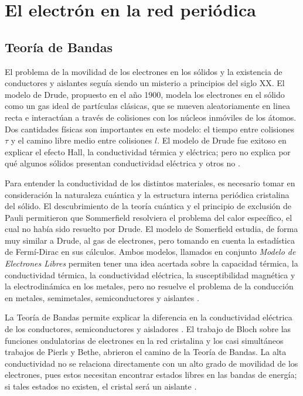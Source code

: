 \chapter{El electrón en la red periódica}

\section{Teoría de Bandas}\label{cap:1}
El problema de la movilidad de los electrones en los sólidos y la existencia de conductores y aislantes seguía siendo un misterio a principios del siglo XX. El modelo de Drude, propuesto en el año 1900, modela los electrones en el sólido como un gas ideal de partículas clásicas, que se mueven aleatoriamente en linea recta e interactúan a través de colisiones con los núcleos inmóviles de los átomos. Dos cantidades físicas son importantes en este modelo: el tiempo entre colisiones $\tau$ y el camino libre medio entre colisiones $l$. El modelo de Drude fue exitoso en explicar el efecto Hall, la conductividad térmica y eléctrica; pero no explica por qué algunos sólidos presentan conductividad eléctrica y otros no \cite{kittel}.

Para entender la conductividad de los distintos materiales, es necesario tomar en consideración la naturaleza cuántica y la estructura interna periódica cristalina del sólido. El descubrimiento de la teoría cuántica y el principio de exclusión de Pauli permitieron que Sommerfield resolviera el problema del calor específico, el cual no había sido resuelto por Drude. El modelo de Somerfield estudia, de forma muy similar a Drude, al gas de electrones, pero tomando en cuenta la estadística de Fermí-Dirac en sus cálculos. Ambos modelos, llamados en conjunto \textit{Modelo de Electrones Libres} permiten tener una idea acertada sobre la capacidad térmica, la conductividad térmica, la conductividad eléctrica, la susceptibilidad magnética y la electrodinámica en los metales, pero no resuelve el problema de la conducción en metales, semimetales, semiconductores y aislantes \cite{ashc}.

La Teoría de Bandas permite explicar la diferencia en la conductividad eléctrica de los conductores, semiconductores y aisladores \cite{valen}. El trabajo de Bloch sobre las funciones ondulatorias de electrones en la red cristalina y los casi simultáneos trabajos de Pierls y Bethe, abrieron el camino de la Teoría de Bandas. La alta conductividad no se relaciona directamente con un alto grado de movilidad de los electrones, pues estos necesitan encontrar estados libres en las bandas de energía; si tales estados no existen, el cristal será un aislante \cite{Kragh}.


